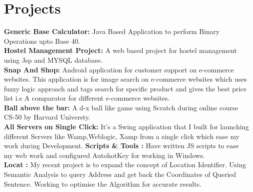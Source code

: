 \documentclass[a4paper,10pt]{article}
\begin{document}
\section{Projects}
\textbf{Generic Base Calculator:} \normalsize Java Based Application to perform Binary Operations upto Base 40. \\
\textbf{Hostel Management Project:} \normalsize A web based project for hostel management using Jsp and MYSQL database. \\
\textbf{Snap And Shop:} \normalsize Android application for customer support on e-commerce websites. This application is for image search on e-commerce websites which uses fuzzy logic approach and tags search for specific product and gives the best price list i.e A comparator for different e-commerce websites. \\
\textbf{Ball above the bar:} \normalsize A d-x ball like game using Scratch during online course CS-50 by Harvard Universty.\\
\textbf{All Servers on Single Click:} \normalsize It’s a Swing application that I built for launching different Servers like Wamp,Weblogic, Xamp from a single click which ease my work during Development.
\textbf{Scripts \& Tools :} \normalsize Have written JS scripts to ease my web work and configured AutohotKey for working in Windows.\\
\textbf{Locat :} \normalsize My recent project is to expand the concept of Location Identifier. Using Semantic Analysis to query Address and get back the Coordinates of Queried Sentence. Working to optimise the Algorithm for accurate results. 
\end{document}
